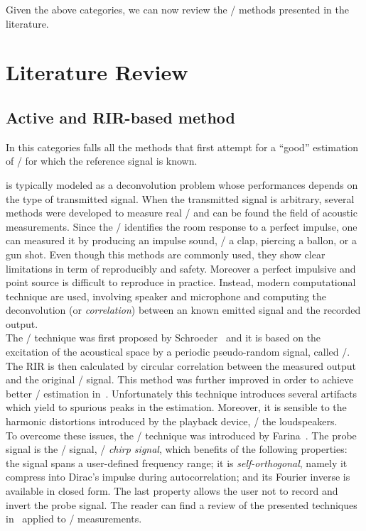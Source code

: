 \mynewline
Given the above categories, we can now review the \AER/ methods presented in the literature.

\section{Literature Review}\label{sec:estimation:sota}

\subsection{Active and RIR-based method}
In this categories falls all the methods that first attempt for a ``good'' estimation of \RIRs/ for which the reference signal is known.

 is typically modeled as a deconvolution problem whose performances depends on the type of transmitted signal.
When the transmitted signal is arbitrary, several methods were developed to measure real \RIRs/ and can be found the field of acoustic measurements.
Since the \RIR/ identifies the room response to a perfect impulse, one can measured it by producing an impulse sound, \eg/ a clap, piercing a ballon, or a gun shot.
Even though this methods are commonly used, they show clear limitations in term of reproducibly and safety.
Moreover a perfect impulsive and point source is difficult to reproduce in practice.
Instead, modern computational technique are used, involving speaker and microphone and computing the deconvolution (or \textit{correlation}) between an known emitted signal and the recorded output.
\\The \MLSdef/ technique was first proposed by Schroeder~ and it is based on the excitation of the acoustical space by a periodic pseudo-random signal, called \MLS/.
The RIR is then calculated by circular correlation between the measured output and the original \MLS/ signal.
This method was further improved in order to achieve better \RIR/ estimation in~.
Unfortunately this technique introduces several artifacts which yield to spurious peaks in the estimation.
Moreover, it is sensible to the harmonic distortions introduced by the playback device, \eg/ the loudspeakers.
\\To overcome these issues, the \ESSdef/ technique was introduced by Farina~.
The probe signal is the \ESS/ signal, \aka/ \textit{chirp signal}, which benefits of the following properties:
the signal spans a user-defined frequency range; it is \textit{self-orthogonal}, namely it compress into Dirac's impulse during autocorrelation; and its Fourier inverse is available in closed form.
The last property allows the user not to record and invert the probe signal.
The reader can find a review of the presented techniques in~ applied to \RIR/ measurements.

